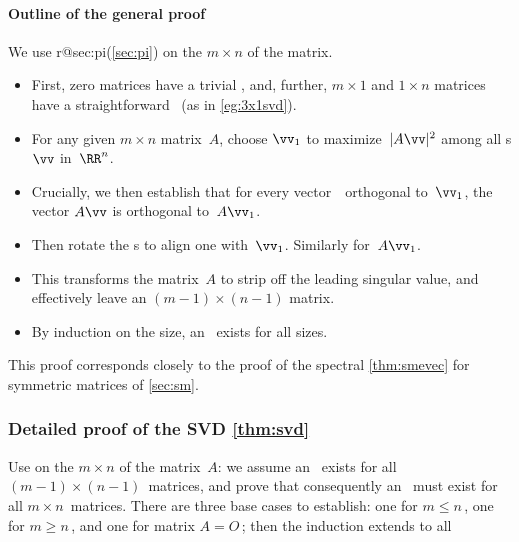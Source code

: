 \begin{example}
\begin{solution}
\end{solution}
\end{example}





\paragraph{Outline of the general proof} 
We use  
\ifcsname r@sec:pi\endcsname (\cref{sec:pi}) \fi
on the  \(m\times n\) of the matrix.
\begin{itemize}
\item First, zero matrices have a trivial \svd, and, further,
\(m\times 1\) and \(1\times n\) matrices have a straightforward \svd\ (as in \cref{eg:3x1svd}).
\item For any given \(m\times n\) matrix~\(A\), choose \(\vv_1\) to maximize~\(|A\vv|^2\) among all s \(\vv\) in~\(\RR^n\).
\item Crucially, we then establish that for every vector~\vv\ orthogonal to~\(\vv_1\), the vector \(A\vv\) is orthogonal to~\(A\vv_1\).
\item Then rotate the s to align one with~\(\vv_1\). Similarly for~\(A\vv_1\).  
\item This  transforms the matrix~\(A\) to strip off the leading singular value, and effectively leave an \((m-1)\times(n-1)\) matrix.
\item  By induction on the size, an \svd\ exists for all sizes.
\end{itemize}
This proof corresponds closely to the proof of the spectral \cref{thm:smevec} for symmetric matrices of \cref{sec:sm}. 





\subsubsection{Detailed proof of the SVD \cref{thm:svd}}
\label{sec:dpsvdt}

Use  on the  \(m\times n\) of the matrix~\(A\): we assume an \svd\ exists for all \((m-1)\times(n-1)\)~matrices, and prove that consequently an \svd\ must exist for all \(m\times n\)~matrices.  There are three base cases to establish: one for \(m\leq n\)\,, one for \(m\geq n\)\,, and one for matrix \(A=O\)\,; then the induction extends to all 

